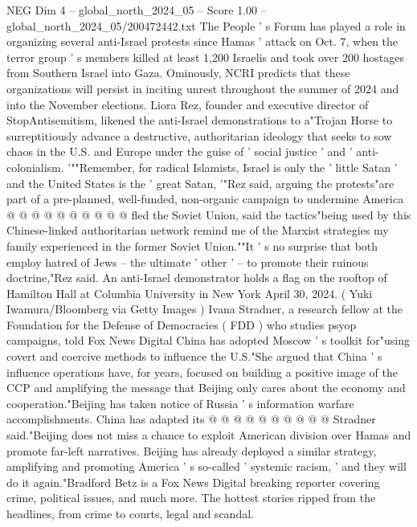 \begin{textsample}{NEG Dim 4 – global\_north\_2024\_05 – Score 1.00 – global\_north\_2024\_05/200472442.txt}
The People ' s Forum has played a role in organizing several anti-Israel protests since Hamas ' attack on Oct. 7, when the terror group ' s members killed at least 1,200 Israelis and took over 200 hostages from Southern Israel into Gaza.
Ominously, NCRI predicts that these organizations will persist in inciting unrest throughout the summer of 2024 and into the November elections.
Liora Rez, founder and executive director of StopAntisemitism, likened the anti-Israel demonstrations to a"Trojan Horse to surreptitiously advance a destructive, authoritarian ideology that seeks to sow chaos in the U.S. and Europe under the guise of ' social justice ' and ' anti-colonialism. '""Remember, for radical Islamists, Israel is only the ' little Satan ' and the United States is the ' great Satan, '"Rez said, arguing the protests"are part of a pre-planned, well-funded, non-organic campaign to undermine America @ @ @ @ @ @ @ @ @ @ fled the Soviet Union, said the tactics"being used by this Chinese-linked authoritarian network remind me of the Marxist strategies my family experienced in the former Soviet Union.""It ' s no surprise that both employ hatred of Jews -- the ultimate ' other ' -- to promote their ruinous doctrine,"Rez said.
An anti-Israel demonstrator holds a flag on the rooftop of Hamilton Hall at Columbia University in New York April 30, 2024. ( Yuki Iwamura/Bloomberg via Getty Images ) Ivana Stradner, a research fellow at the Foundation for the Defense of Democracies ( FDD ) who studies psyop campaigns, told Fox News Digital China has adopted Moscow ' s toolkit for"using covert and coercive methods to influence the U.S."She argued that China ' s influence operations have, for years, focused on building a positive image of the CCP and amplifying the message that Beijing only cares about the economy and cooperation."Beijing has taken notice of Russia ' s information warfare accomplishments.
China has adapted its @ @ @ @ @ @ @ @ @ @ Stradner said."Beijing does not miss a chance to exploit American division over Hamas and promote far-left narratives.
Beijing has already deployed a similar strategy, amplifying and promoting America ' s so-called ' systemic racism, ' and they will do it again."Bradford Betz is a Fox News Digital breaking reporter covering crime, political issues, and much more.
The hottest stories ripped from the headlines, from crime to courts, legal and scandal.

\end{textsample}
